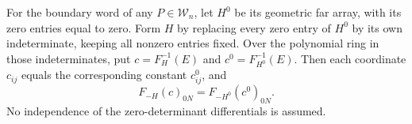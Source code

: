 \begin{lemma}
\label{pf:formal-cancellation}
For the boundary word of any $P\in\mathcal W_n$, let $H^0$ be its
geometric far array, with its zero entries equal to zero. Form $H$
by replacing every zero entry of $H^0$ by its own indeterminate,
keeping all nonzero entries fixed. Over the polynomial ring in those
indeterminates, put $c=F_H^{-1}(E)$ and $c^0=F_{H^0}^{-1}(E)$.
Then each coordinate $c_{ij}$ equals the corresponding constant $c^0_{ij}$, and
\begin{equation}\label{pf:formal-output}
 F_{-H}(c)_{0N}=F_{-H^0}(c^0)_{0N}.
\end{equation}
No independence of the zero-determinant differentials is assumed.
\end{lemma}
